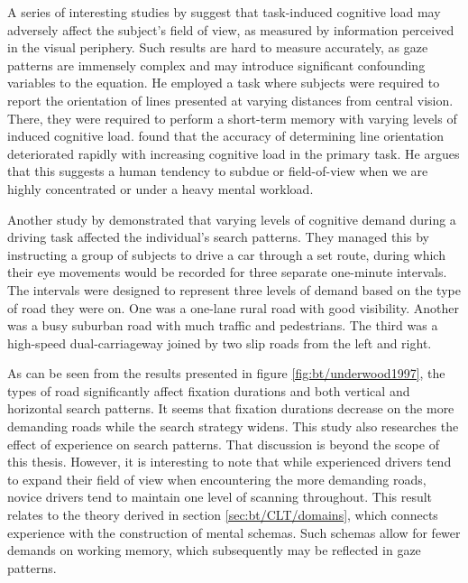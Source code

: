 A series of interesting studies by \textcite{williams1982, williams1985, williams1988} suggest that task-induced cognitive load may adversely affect the subject's field of view, as measured by information perceived in the visual periphery. Such results are hard to measure accurately, as gaze patterns are immensely complex and may introduce significant confounding variables to the equation. He employed a task where subjects were required to report the orientation of lines presented at varying distances from central vision. There, they were required to perform a short-term memory with varying levels of induced cognitive load. \textcite{williams1985} found that the accuracy of determining line orientation deteriorated rapidly with increasing cognitive load in the primary task. He argues that this suggests a human tendency to subdue or field-of-view when we are highly concentrated or under a heavy mental workload.

Another study by \textcite{underwood1997} demonstrated that varying levels of cognitive demand during a driving task affected the individual's search patterns. They managed this by instructing a group of subjects to drive a car through a set route, during which their eye movements would be recorded for three separate one-minute intervals. The intervals were designed to represent three levels of demand based on the type of road they were on. One was a one-lane rural road with good visibility. Another was a busy suburban road with much traffic and pedestrians. The third was a high-speed dual-carriageway joined by two slip roads from the left and right. 

As can be seen from the results presented in figure \ref{fig:bt/underwood1997}, the types of road significantly affect fixation durations and both vertical and horizontal search patterns. It seems that fixation durations decrease on the more demanding roads while the search strategy widens. This study also researches the effect of experience on search patterns. That discussion is beyond the scope of this thesis. However, it is interesting to note that while experienced drivers tend to expand their field of view when encountering the more demanding roads, novice drivers tend to maintain one level of scanning throughout. 
This result relates to the theory derived in section \ref{sec:bt/CLT/domains}, which connects experience with the construction of mental schemas. Such schemas allow for fewer demands on working memory, which subsequently may be reflected in gaze patterns.

